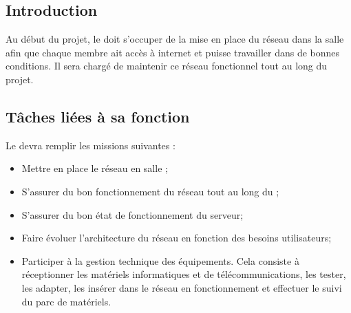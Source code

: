 
\subsection*{Introduction}

Au début du projet, le \RRS{} doit s'occuper de la mise en place du réseau dans la salle \PICCourt afin que chaque membre ait accès à internet et puisse travailler dans de bonnes conditions. Il sera chargé de maintenir ce réseau fonctionnel tout au long du projet.

\subsection*{Tâches liées à sa fonction}

Le \RRS{} devra remplir les missions suivantes :
\begin{itemize}
	\item Mettre en place le réseau en salle \PICCourt;
	\item S'assurer du bon fonctionnement du réseau tout au long du \PICCourt;
	\item S'assurer du bon état de fonctionnement du serveur;
	\item Faire évoluer l'architecture du réseau en fonction des besoins utilisateurs;
	\item Participer à la gestion technique des équipements. Cela consiste à réceptionner les matériels informatiques et de télécommunications, les tester, les adapter, les insérer dans le réseau en fonctionnement et effectuer le suivi du parc de matériels.
\end{itemize}
